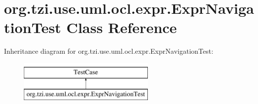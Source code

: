 \hypertarget{classorg_1_1tzi_1_1use_1_1uml_1_1ocl_1_1expr_1_1_expr_navigation_test}{\section{org.\-tzi.\-use.\-uml.\-ocl.\-expr.\-Expr\-Navigation\-Test Class Reference}
\label{classorg_1_1tzi_1_1use_1_1uml_1_1ocl_1_1expr_1_1_expr_navigation_test}
}
Inheritance diagram for org.\-tzi.\-use.\-uml.\-ocl.\-expr.\-Expr\-Navigation\-Test\-:\begin{figure}[H]
\begin{center}
\leavevmode
\includegraphics[height=2.000000cm]{classorg_1_1tzi_1_1use_1_1uml_1_1ocl_1_1expr_1_1_expr_navigation_test}
\end{center}
\end{figure}
